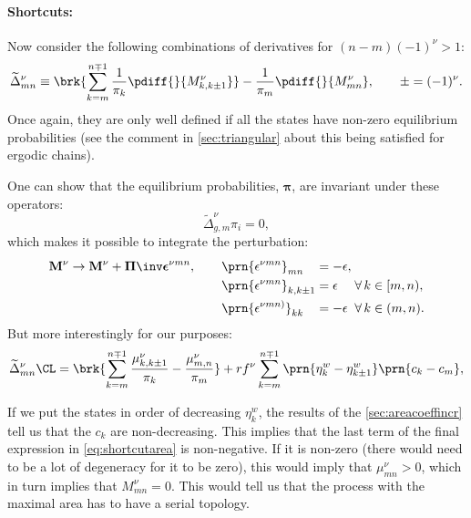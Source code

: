 \documentclass[12pt]{article}
\newcommand{\eqm}{\pi}
\newcommand{\eq}{\boldsymbol{\eqm}}
\newcommand{\Eqm}{\Pi}
\newcommand{\Eq}{\boldsymbol{\Eqm}}
\newcommand{\etwm}{\eta^w}
\newcommand{\MMdm}{M}
\newcommand{\MMd}{\mathbf{\MMdm}}
\begin{document}
\paragraph{Shortcuts:}\label{sec:shortcuts}

Now consider the following combinations of derivatives for $(n - m)(-1)^\nu > 1$:
%
\begin{equation}\label{eq:shortcutderiv}
  \widetilde{\Delta}^\nu_{mn} \equiv
    \brk{ \sum_{k=m}^{n \mp 1} \frac{1}{\eqm_{k}} \pdiff{}{\MMdm^\nu_{k,k \pm 1}} }
    - \frac{1}{\eqm_m} \pdiff{}{\MMdm^\nu_{mn}},
  \qquad \pm = (-1)^\nu.
\end{equation}
%
Once again, they are only well defined if all the states have non-zero equilibrium probabilities (see the comment in \cref{sec:triangular} about this being satisfied for ergodic chains).

One can show that the equilibrium probabilities, $\eq$, are invariant under these operators:
%
\begin{equation}\label{eq:shortcutprob}
  \widetilde{\Delta}^\nu_{g,m} \eqm_i = 0,
\end{equation}
%
which makes it possible to integrate the perturbation:
%
\begin{equation}\label{eq:shortcutfinite}
  \MMd^\nu \to \MMd^\nu + \Eq\inv \boldsymbol{\epsilon}^{\nu mn},
  \qquad
  \begin{alignedat}[t]{3}
    &\prn{{\epsilon}^{\nu mn}}_{mn}
      &&= -\epsilon,\\
    &\prn{{\epsilon}^{\nu mn}}_{k,k\pm1}
      &&= \epsilon
      &\;&\forall\, k \in [m,n),\\
    &\prn{{\epsilon}^{\nu mn)}}_{kk}
      &&= -\epsilon
      &&\forall\, k \in (m,n).
  \end{alignedat}
\end{equation}
%
But more interestingly for our purposes:
%
\begin{equation}\label{eq:shortcutarea}
    \widetilde{\Delta}^\nu_{mn}\CL =
      \brk{ \sum_{k=m}^{n\mp1} \frac{\mu^\nu_{k,k\pm1}}{\eqm_k}
      - \frac{\mu^\nu_{m,n}}{\eqm_m}}
      + rf^\nu \sum_{k=m}^{n\mp1} \prn{\etwm_{k} - \etwm_{k\pm1}} \prn{c_k - c_m},
\end{equation}
%

If we put the states in order of decreasing $\etwm_k$, the results of the \cref{sec:areacoeffincr} tell us that the $c_k$ are non-decreasing.
This implies that the last term of the final expression in \eqref{eq:shortcutarea} is non-negative.
If it is non-zero (there would need to be a lot of degeneracy for it to be zero), this would imply that $\mu^\nu_{mn} > 0$, which in turn implies that $\MMdm^\nu_{mn}=0$.
This would tell us that the process with the maximal area has to have a serial topology.
\end{document}
